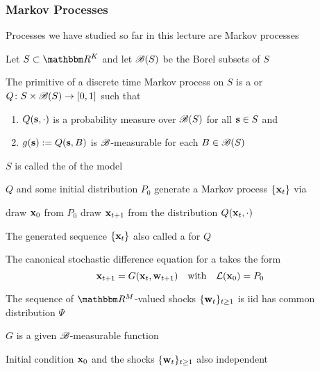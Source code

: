 \begin{frame}\frametitle{Markov Processes}
    
    \vspace{2em}
    Processes we have studied so far in this lecture are Markov processes 

    \vspace{.7em}
    Let $S\subset\RR^K$ and let
    $\mathscr B(S)$ be the Borel subsets of $S$  
    
    The primitive of a discrete
    time Markov process on $S$ is a  or  $Q \colon S \times \mathscr B(S) \to [0,1]$ such that
    \begin{enumerate}
    \item $Q({\mathbf s}, \cdot)$ is a probability measure over $\mathscr B(S)$ for all
        ${\mathbf s} \in S$ and
    \item $g({\mathbf s}) := Q({\mathbf s}, B)$ is $\mathscr B$-measurable for each $B \in \mathscr B(S)$
    \end{enumerate}
    $S$ is called the  of the model 
    
\end{frame}

\begin{frame}

    \vspace{2em}
    $Q$ and some initial
    distribution $P_0$ generate a Markov process $\{{\mathbf x}_t\}$ via
    
    \vspace{0.6em}
    \begin{algorithmic}[1]
        \State draw ${\mathbf x}_0$ from $P_0$
            \State draw ${\mathbf x}_{t+1}$ from the distribution $Q({\mathbf x}_t, \cdot)$
        \EndFor
    \end{algorithmic}

    The generated sequence $\{{\mathbf x}_t\}$ also called a  for $Q$
    
\end{frame}

\begin{frame} 

    \vspace{2em}
    The canonical stochastic difference
    equation for a  takes the form 
    \begin{equation}
        \label{eq:amp}
        {\mathbf x}_{t+1} = G({\mathbf x}_t, {\mathbf w}_{t+1})
        \quad \text{with} \quad
        \mathcal L({\mathbf x}_0) = P_0
    \end{equation}
    
    \vspace{1em}
    The sequence of $\RR^M$-valued shocks $\{{\mathbf w}_t\}_{t \geq 1}$ is {\sc iid} 
    has common distribution $\Psi$
    
    $G$ is a given $\mathscr B$-measurable function 
    
    Initial condition ${\mathbf x}_0$ and the shocks $\{{\mathbf w}_t\}_{t \geq 1}$ also independent
    
\end{frame}

